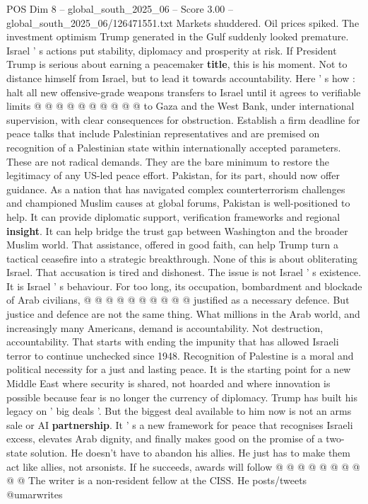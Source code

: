 \begin{textsample}{POS Dim 8 – global\_south\_2025\_06 – Score 3.00 – global\_south\_2025\_06/126471551.txt}
Markets shuddered.
Oil prices spiked.
The investment optimism Trump generated in the Gulf suddenly looked premature.
Israel ' s actions put stability, diplomacy and prosperity at risk.
If President Trump is serious about earning a peacemaker \textbf{title}, this is his moment.
Not to distance himself from Israel, but to lead it towards accountability.
Here ' s how : halt all new offensive-grade weapons transfers to Israel until it agrees to verifiable limits @ @ @ @ @ @ @ @ @ @ to Gaza and the West Bank, under international supervision, with clear consequences for obstruction.
Establish a firm deadline for peace talks that include Palestinian representatives and are premised on recognition of a Palestinian state within internationally accepted parameters.
These are not radical demands.
They are the bare minimum to restore the legitimacy of any US-led peace effort.
Pakistan, for its part, should now offer guidance.
As a nation that has navigated complex counterterrorism challenges and championed Muslim causes at global forums, Pakistan is well-positioned to help.
It can provide diplomatic support, verification frameworks and regional \textbf{insight}.
It can help bridge the trust gap between Washington and the broader Muslim world.
That assistance, offered in good faith, can help Trump turn a tactical ceasefire into a strategic breakthrough.
None of this is about obliterating Israel.
That accusation is tired and dishonest.
The issue is not Israel ' s existence.
It is Israel ' s behaviour.
For too long, its occupation, bombardment and blockade of Arab civilians, @ @ @ @ @ @ @ @ @ @ justified as a necessary defence.
But justice and defence are not the same thing.
What millions in the Arab world, and increasingly many Americans, demand is accountability.
Not destruction, accountability.
That starts with ending the impunity that has allowed Israeli terror to continue unchecked since 1948.
Recognition of Palestine is a moral and political necessity for a just and lasting peace.
It is the starting point for a new Middle East where security is shared, not hoarded and where innovation is possible because fear is no longer the currency of diplomacy.
Trump has built his legacy on ' big deals '.
But the biggest deal available to him now is not an arms sale or AI \textbf{partnership}.
It ' s a new framework for peace that recognises Israeli excess, elevates Arab dignity, and finally makes good on the promise of a two-state solution.
He doesn't have to abandon his allies.
He just has to make them act like allies, not arsonists.
If he succeeds, awards will follow @ @ @ @ @ @ @ @ @ @ The writer is a non-resident fellow at the CISS.
He posts/tweets @umarwrites

\end{textsample}
